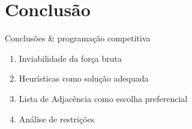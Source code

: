 \section{Conclusão}

\begin{frame}{Conclusões \& programação competitiva}
    \begin{enumerate}
        \item Inviabilidade da força bruta
        \item Heurísticas como solução adequada
        \item Lista de Adjacência como escolha preferencial
        \item Análise de restrições
    \end{enumerate}
\end{frame}